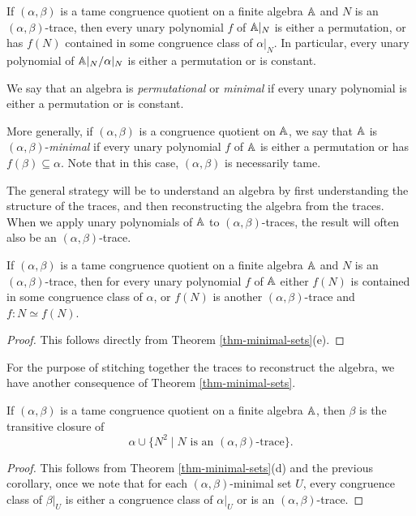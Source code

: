 \begin{appendices}
\begin{cor}\label{cor-trace-permutational} If $(\alpha,\beta)$ is a tame congruence quotient on a finite algebra $\mathbb{A}$ and $N$ is an $(\alpha,\beta)$-trace, then every unary polynomial $f$ of $\mathbb{A}|_N$ is either a permutation, or has $f(N)$ contained in some congruence class of $\alpha|_N$. In particular, every unary polynomial of $\mathbb{A}|_N/\alpha|_N$ is either a permutation or is constant.
\end{cor}

\begin{defn} We say that an algebra is \emph{permutational} or \emph{minimal} if every unary polynomial is either a permutation or is constant.

More generally, if $(\alpha,\beta)$ is a congruence quotient on $\mathbb{A}$, we say that $\mathbb{A}$ is $(\alpha,\beta)$-\emph{minimal} if every unary polynomial $f$ of $\mathbb{A}$ is either a permutation or has $f(\beta) \subseteq \alpha$. Note that in this case, $(\alpha,\beta)$ is necessarily tame.
\end{defn}

The general strategy will be to understand an algebra by first understanding the structure of the traces, and then reconstructing the algebra from the traces. When we apply unary polynomials of $\mathbb{A}$ to $(\alpha,\beta)$-traces, the result will often also be an $(\alpha,\beta)$-trace.

\begin{cor}\label{cor-trace-iso} If $(\alpha,\beta)$ is a tame congruence quotient on a finite algebra $\mathbb{A}$ and $N$ is an $(\alpha,\beta)$-trace, then for every unary polynomial $f$ of $\mathbb{A}$ either $f(N)$ is contained in some congruence class of $\alpha$, or $f(N)$ is another $(\alpha,\beta)$-trace and $f : N \simeq f(N)$.
\end{cor}
\begin{proof} This follows directly from Theorem \ref{thm-minimal-sets}(e).
\end{proof}

For the purpose of stitching together the traces to reconstruct the algebra, we have another consequence of Theorem \ref{thm-minimal-sets}.

\begin{cor}\label{cor-trace-closure} If $(\alpha,\beta)$ is a tame congruence quotient on a finite algebra $\mathbb{A}$, then $\beta$ is the transitive closure of
\[
\alpha \cup \{N^2 \mid N \text{ is an }(\alpha,\beta)\text{-trace}\}.
\]
\end{cor}
\begin{proof} This follows from Theorem \ref{thm-minimal-sets}(d) and the previous corollary, once we note that for each $(\alpha,\beta)$-minimal set $U$, every congruence class of $\beta|_U$ is either a congruence class of $\alpha|_U$ or is an $(\alpha,\beta)$-trace.
\end{proof}


\end{appendices}
